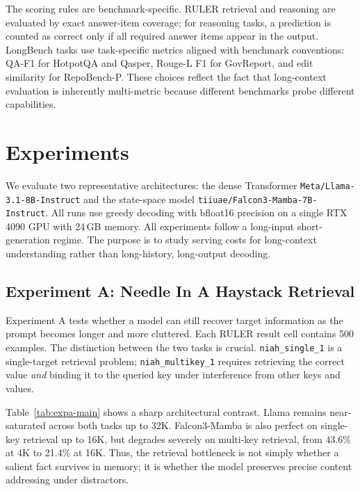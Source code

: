 \documentclass{article}
\begin{document}
The scoring rules are benchmark-specific. RULER retrieval and reasoning are evaluated by exact answer-item coverage; for reasoning tasks, a prediction is counted as correct only if all required answer items appear in the output. LongBench tasks use task-specific metrics aligned with benchmark conventions: QA-F1 for HotpotQA and Qasper, Rouge-L F1 for GovReport, and edit similarity for RepoBench-P. These choices reflect the fact that long-context evaluation is inherently multi-metric because different benchmarks probe different capabilities.

\section{Experiments}
\label{sec:experiments}

We evaluate two representative architectures: the dense Transformer \texttt{Meta/Llama-3.1-8B-Instruct} and the state-space model \texttt{tiiuae/Falcon3-Mamba-7B-Instruct}. All runs use greedy decoding with bfloat16 precision on a single RTX 4090 GPU with 24\,GB memory. All experiments follow a long-input short-generation regime. The purpose is to study serving costs for long-context understanding rather than long-history, long-output decoding.

\subsection{Experiment A: Needle In A Haystack Retrieval}
Experiment A tests whether a model can still recover target information as the prompt becomes longer and more cluttered. Each RULER result cell contains 500 examples. The distinction between the two tasks is crucial. \texttt{niah\_single\_1} is a single-target retrieval problem; \texttt{niah\_multikey\_1} requires retrieving the correct value \emph{and} binding it to the queried key under interference from other keys and values.

Table~\ref{tab:expa-main} shows a sharp architectural contrast. Llama remains near-saturated across both tasks up to 32K. Falcon3-Mamba is also perfect on single-key retrieval up to 16K, but degrades severely on multi-key retrieval, from 43.6\% at 4K to 21.4\% at 16K. Thus, the retrieval bottleneck is not simply whether a salient fact survives in memory; it is whether the model preserves precise content addressing under distractors.
\end{document}
